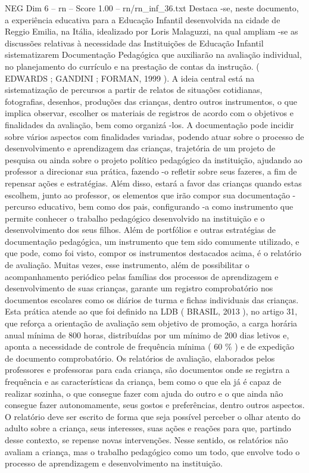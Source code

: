 \begin{textsample}{NEG Dim 6 – rn – Score 1.00 – rn/rn\_inf\_36.txt}
Destaca -se, neste documento, a experiência educativa para a Educação Infantil desenvolvida na cidade de Reggio Emilia, na Itália, idealizado por Loris Malaguzzi, na qual ampliam -se as discussões relativas à necessidade das Instituições de Educação Infantil sistematizarem Documentação Pedagógica que auxiliarão na avaliação individual, no planejamento do currículo e na prestação de contas da instrução. ( EDWARDS ; GANDINI ; FORMAN, 1999 ).
A ideia central está na sistematização de percursos a partir de relatos de situações cotidianas, fotografias, desenhos, produções das crianças, dentro outros instrumentos, o que implica observar, escolher os materiais de registros de acordo com o objetivos e finalidades da avaliação, bem como organizá -los.
A documentação pode incidir sobre vários aspectos com finalidades variadas, podendo atuar sobre o processo de desenvolvimento e aprendizagem das crianças, trajetória de um projeto de pesquisa ou ainda sobre o projeto político pedagógico da instituição, ajudando ao professor a direcionar sua prática, fazendo -o refletir sobre seus fazeres, a fim de repensar ações e estratégias.
Além disso, estará a favor das crianças quando estas escolhem, junto ao professor, os elementos que irão compor sua documentação - percurso educativo, bem como dos pais, configurando -a como instrumento que permite conhecer o trabalho pedagógico desenvolvido na instituição e o desenvolvimento dos seus filhos.
Além de portfólios e outras estratégias de documentação pedagógica, um instrumento que tem sido comumente utilizado, e que pode, como foi visto, compor os instrumentos destacados acima, é o relatório de avaliação.
Muitas vezes, esse instrumento, além de possibilitar o acompanhamento periódico pelas famílias dos processos de aprendizagem e desenvolvimento de suas crianças, garante um registro comprobatório nos documentos escolares como os diários de turma e fichas individuais das crianças.
Esta prática atende ao que foi definido na LDB ( BRASIL, 2013 ), no artigo 31, que reforça a orientação de avaliação sem objetivo de promoção, a carga horária anual mínima de 800 horas, distribuídas por um mínimo de 200 dias letivos e, aponta a necessidade de controle de frequência mínima ( 60 \% ) e de expedição de documento comprobatório.
Os relatórios de avaliação, elaborados pelos professores e professoras para cada criança, são documentos onde se registra a frequência e as características da criança, bem como o que ela já é capaz de realizar sozinha, o que consegue fazer com ajuda do outro e o que ainda não consegue fazer autonomamente, seus gostos e preferências, dentro outros aspectos.
O relatório deve ser escrito de forma que seja possível perceber o olhar atento do adulto sobre a criança, seus interesses, suas ações e reações para que, partindo desse contexto, se repense novas intervenções.
Nesse sentido, os relatórios não avaliam a criança, mas o trabalho pedagógico como um todo, que envolve todo o processo de aprendizagem e desenvolvimento na instituição.

\end{textsample}
